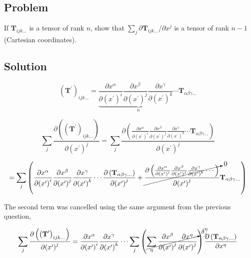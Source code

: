 \documentclass[12pt]{article}
\begin{document}
\subsection{Problem}

If \(\textbf{T}_{ijk\ldots}\) is a tensor of rank \(n\), show that
\(\sum_j \partial \textbf{T}_{ijk\ldots}/\partial x^j\) is a tensor of rank \(n - 1\)
(Cartesian coordinates).

\subsection{Solution}

\[
    {\left(\textbf{T}^\prime\right)}_{ijk \ldots}
    = \underbrace{
        \frac{\partial x^\alpha}{\partial {\left(x^\prime\right)}^i}
        \frac{\partial x^\beta}{\partial {\left(x^\prime\right)}^j}
        \frac{\partial x^\gamma}{\partial {\left(x^\prime\right)}^k}
        \cdots
    }_n
    \textbf{T}_{\alpha \beta \gamma \ldots}
\]

\[
    \sum_j
    \frac
    {\partial \left({\left(\textbf{T}^\prime\right)}_{ijk \ldots}\right)}
    {\partial {\left(x^\prime\right)}^j}
    = \sum_j
    \frac
    {\partial \left(
        \frac{\partial x^\alpha}{\partial {\left(x^\prime\right)}^i}
        \frac{\partial x^\beta}{\partial {\left(x^\prime\right)}^j}
        \frac{\partial x^\gamma}{\partial {\left(x^\prime\right)}^k}
        \cdots
        \textbf{T}_{\alpha \beta \gamma \ldots}\right)}
    {\partial {\left(x^\prime\right)}^j}
\]

\[
    = \sum_j
    \left(
    \frac{\partial x^\alpha}{\partial {\left(x^\prime\right)}^i}
    \frac{\partial x^\beta}{\partial {\left(x^\prime\right)}^j}
    \frac{\partial x^\gamma}{\partial {\left(x^\prime\right)}^k}
    \cdots \frac
    {\partial \left(\textbf{T}_{\alpha \beta \gamma \ldots}\right)}
    {\partial {\left(x^\prime\right)}^j}
    + \cancelto{0}{\frac{\partial
            \left(
            \frac{\partial x^\alpha}{\partial {\left(x^\prime\right)}^i}
            \frac{\partial x^\beta}{\partial {\left(x^\prime\right)}^j}
            \frac{\partial x^\gamma}{\partial {\left(x^\prime\right)}^k}
            \cdots
            \right)}
        {\partial {\left(x^\prime\right)}^j}}
    \textbf{T}_{\alpha \beta \gamma \ldots}
    \right)
\]

The second term was cancelled using the same argument from the previous question,

\[
    \sum_j
    \frac
    {\partial \left({\left(\textbf{T}^\prime\right)}_{ijk \ldots}\right)}
    {\partial {\left(x^\prime\right)}^j}
    = \frac{\partial x^\alpha}{\partial {\left(x^\prime\right)}^i}
    \frac{\partial x^\gamma}{\partial {\left(x^\prime\right)}^k}
    \cdots
    \sum_j
    \left(\cancelto{\delta^\eta_j}{\sum_\eta
    \frac{\partial x^\beta}{\partial {\left(x^\prime\right)}^j}
    \frac{\partial x^\eta}{\partial {\left(x^\prime\right)}^j}}\right)
    \frac
    {\partial \left(\textbf{T}_{\alpha \beta \gamma \ldots}\right)}
    {\partial x^\eta}
\]
\end{document}
